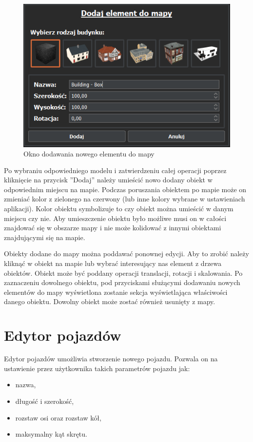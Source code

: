 \documentclass[a4paper,11pt,twoside]{report}
\theoremstyle{definition}
\begin{document}
\begin{figure}[h!]
\centering
\includegraphics[scale=0.9]{instructionAddMapElement}
\caption[Okno dodawania nowego elementu do mapy]{Okno dodawania nowego elementu do mapy}
\end{figure}

Po wybraniu odpowiedniego modelu i zatwierdzeniu całej operacji poprzez kliknięcie na przycisk ''Dodaj'' należy umieścić nowo dodany obiekt w odpowiednim miejscu na mapie. Podczas poruszania obiektem po mapie może on zmieniać kolor z zielonego na czerwony (lub inne kolory wybrane w ustawieniach aplikacji). Kolor obiektu symbolizuje to czy obiekt można umieścić w danym miejscu czy nie. Aby umieszczenie obiektu było możliwe musi on w całości znajdować się w obszarze mapy i nie może kolidować z innymi obiektami znajdującymi  się na mapie.

Obiekty dodane do mapy można poddawać ponownej edycji. Aby to zrobić należy kliknąć w obiekt na mapie lub wybrać interesujący nas element z drzewa obiektów. Obiekt może być poddany operacji translacji, rotacji i skalowania. Po zaznaczeniu dowolnego obiektu, pod przyciskami służącymi dodawaniu nowych elementów do mapy wyświetlona zostanie sekcja wyświetlająca właściwości danego obiektu. Dowolny obiekt może zostać również usunięty z mapy.

\section{Edytor pojazdów}

Edytor pojazdów umożliwia stworzenie nowego pojazdu. Pozwala on na ustawienie przez użytkownika takich parametrów pojazdu jak:
\begin{itemize}
	\item nazwa,
	\item długość i szerokość,
	\item rozstaw osi oraz rozstaw kół,
	\item maksymalny kąt skrętu.
\end{itemize}
\end{document}
